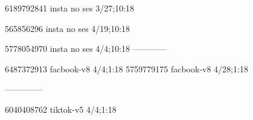 6189792841 insta no ses
3/27;10:18

565856296 insta no ses
4/19;10:18

5778054970 insta no ses
4/4;10:18
------------

6487372913 facbook-v8
4/4;1:18
5759779175 facbook-v8
4/28;1:18


--------------

6040408762 tiktok-v5
4/4;1:18
